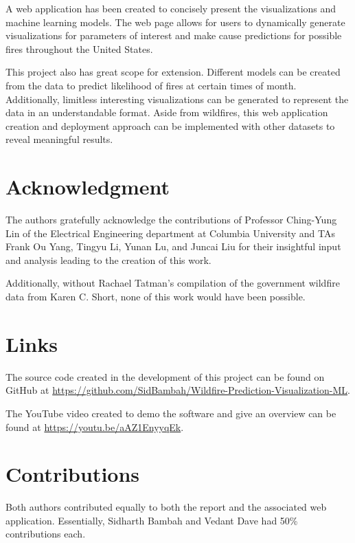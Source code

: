 \documentclass[conference]{IEEEtran}
\begin{document}
A web application has been created to concisely present the visualizations and machine learning models. The web page allows for users to dynamically generate visualizations for parameters of interest and make cause predictions for possible fires throughout the United States. \par

This project also has great scope for extension. Different models can be created from the data to predict likelihood of fires at certain times of month. Additionally, limitless interesting visualizations can be generated to represent the data in an understandable format. Aside from wildfires, this web application creation and deployment approach can be implemented with other datasets to reveal meaningful results. \par

\section*{Acknowledgment}
The authors gratefully acknowledge the contributions of Professor Ching-Yung Lin of the Electrical Engineering department at Columbia University and TAs Frank Ou Yang, Tingyu Li, Yunan Lu, and Juncai Liu for their insightful input and analysis leading to the creation of this work. \par
Additionally, without Rachael Tatman's compilation of the government wildfire data from Karen C. Short, none of this work would have been possible. \par

\nocite{*}

 \appendices

\section{Links}
\label{appendix:Links}
The source code created in the development of this project can be found on GitHub at \url{https://github.com/SidBambah/Wildfire-Prediction-Visualization-ML}. \par

The YouTube video created to demo the software and give an overview can be found at \url{https://youtu.be/aAZ1EnyyqEk}.\par

\section{Contributions}
Both authors contributed equally to both the report and the associated web application. Essentially, Sidharth Bambah and Vedant Dave had 50\% contributions each. \par
  
\vspace{12pt}
\end{document}
